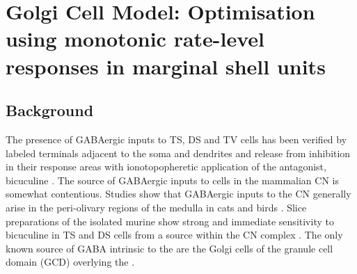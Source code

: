 
\graphicspath{{../figures/}{./gfx/}{/media/data/Work/cnstellate/golgi/}{../../cnstellate/}}

\section[Golgi Cell Model]{Golgi Cell Model: Optimisation using monotonic
  rate-level responses in marginal shell units}\label{sec:GolgiCellModel}

 \subsection{Background}

 The presence of GABAergic inputs to TS, DS and TV cells has been verified by
 labeled terminals adjacent to the soma and dendrites
 \citep{SmithRhode:1989,AwatramaniTurecekEtAl:2005,BabalianRyugoEtAl:2003} and
 release from inhibition in their response areas with ionotopopheretic
 application of the \GABAa antagonist, bicuculine
 \citep{EvansZhao:1998,CasparyBackoffEtAl:1994,BackoffShadduckEtAl:1999,FerragamoGoldingEtAl:1998a}. The
 source of GABAergic inputs to cells in the mammalian CN is somewhat
 contentious. Studies show that GABAergic inputs to the CN generally arise in
 the peri-olivary regions of the medulla in cats \citep{OstapoffBensonEtAl:1997}
 and birds \citep{LachicaRubsamenEtAl:1995,YangMonsivaisEtAl:1999}. Slice
 preparations of the isolated murine \VCN show strong and immediate sensitivity
 to bicuculine in TS and DS cells from a source within the CN complex
 \citep{FerragamoGoldingEtAl:1998a}.  The only known source of GABA intrinsic to
 the \VCN are the Golgi cells of the granule cell domain (GCD) overlying the
 \VCN \citep[Fig.~\ref{fig:CNdiagram}]{Mugnaini:1985,FerragamoGoldingEtAl:1998}.



